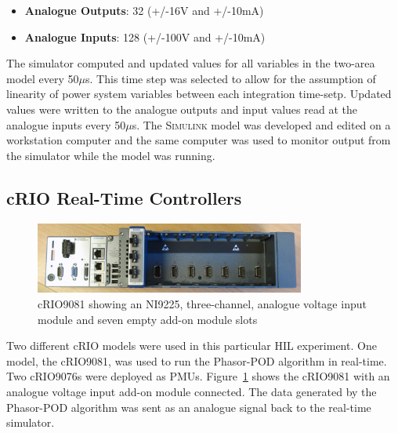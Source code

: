 \documentclass[conference]{IEEEtran}
\begin{document}
\begin{itemize}
\item \textbf{Analogue Outputs}: 32 (+/-16V and +/-10mA)
\item \textbf{Analogue Inputs}: 128 (+/-100V and +/-10mA)
\end{itemize}

The simulator computed and updated values for all variables in the two-area model every 50$\mu$s. This time step was selected to allow for the assumption of linearity of power system variables between each integration time-setp. Updated values were written to the analogue outputs and input values read at the analogue inputs every 50$\mu$s. The \textsc{Simulink} model was developed and edited on a workstation computer and the same computer was used to monitor output from the simulator while the model was running.

\subsection{cRIO Real-Time Controllers}
\begin{figure}[H]
\centering
\includegraphics[width=3.5in]{DSC05446.JPG}
\vspace{-0.5em}
\caption{cRIO9081 showing an NI9225, three-channel, analogue voltage input module and seven empty add-on module slots}
\label{cRIO}
\end{figure}
Two different cRIO models were used in this particular HIL experiment. One model, the cRIO9081, was used to run the Phasor-POD algorithm in real-time. Two cRIO9076s were deployed as PMUs. Figure~\ref{cRIO} shows the cRIO9081 with an analogue voltage input add-on module connected. The data generated by the Phasor-POD algorithm was sent as an analogue signal back to the real-time simulator. 
\end{document}
